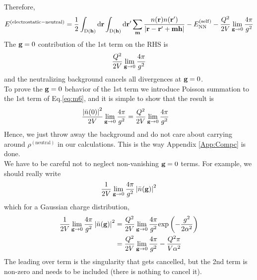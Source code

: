 \documentclass[paper=a4, fontsize=11pt]{article} %
\numberwithin{equation}{section} %
\numberwithin{figure}{section} %
\numberwithin{table}{section} %
\newcommand{\bh}{{\bf{h}}}
\newcommand{\bm}{{\bf{m}}}
\newcommand{\bg}{{\bf{g}}}
\newcommand{\br}{{\bf{r}}}
\newcommand{\rexp}{{\mathrm{exp}}}
\newcommand{\rNN}{{\mathrm{NN}}}
\newcommand{\rself}{{\mathrm{self}}}
\newcommand{\rd}{{\mathrm{d}}}
\newcommand{\rD}{{\mathrm{D}}}
\newcommand{\al}{{\alpha}}
\begin{document}
Therefore,
\begin{equation}\label{eq:m6}
\begin{split}
E^{(\mathrm{electrostatic-neutral})}
&= \frac{1}{2}\int_{\rD(\bh)} \rd \br \int_{\rD(\bh)}\rd \br'\sum_\bm \frac{n(\br)n(\br')}{|\br-\br'+\bm\bh|}- E_{\rNN}^{(\rself)}  - \frac{Q^2}{2V} \lim_{\bg \rightarrow 0} \frac{4\pi}{g^2} \\
\end{split}
\end{equation}
The $\bg = 0$ contribution of the 1st term on the RHS is 
\begin{equation}
\frac{Q^2}{2V} \lim_{\bg \rightarrow 0} \frac{4\pi}{g^2}
\end{equation}
and the neutralizing background cancels all divergences at $\bg = 0$.\\

To prove the $\bg = 0$ behavior of the 1st term we introduce Poisson summation to the 1st term of Eq.\eqref{eq:m6}, and it is simple to show that the result is
\begin{equation}
\begin{split}
\frac{\left|\bar n(0)\right|^2}{2V}\lim_{\bg \rightarrow 0} \frac{4\pi}{g^2}
&= \frac{Q^2}{2V} \lim_{\bg \rightarrow 0} \frac{4\pi}{g^2} 
\end{split}
\end{equation}
Hence, we just throw away the background and do not care about carrying around $\rho^{(\mathrm{neutral})}$ in our calculations. This is the way Appendix \ref{App:Compc} is done.\\

We have to be careful not to neglect non-vanishing $\bg = 0$ terms. For example, we should really write
\begin{equation}
\frac{1}{2V}\lim_{\bg \rightarrow 0} \frac{4\pi}{g^2} \left|\bar n(\bg)\right|^2
\end{equation}
which for a Gaussian charge distribution, 
\begin{equation}
\begin{split}
\frac{1}{2V}\lim_{\bg \rightarrow 0} \frac{4\pi}{g^2} \left|\bar n(\bg)\right|^2
&= \frac{Q^2}{2V}\lim_{\bg \rightarrow 0}\frac{4\pi}{g^2} \rexp\left(-\frac{g^2}{2\al^2}\right)\\
&= \frac{Q^2}{2V}\lim_{\bg \rightarrow 0}\frac{4\pi}{g^2} -\frac{Q^2 \pi}{V \al^2}
\end{split}
\end{equation}
The leading over term is the singularity that gets cancelled, but the 2nd term is non-zero and needs to be included (there is nothing to cancel it).
\\
\end{document}

